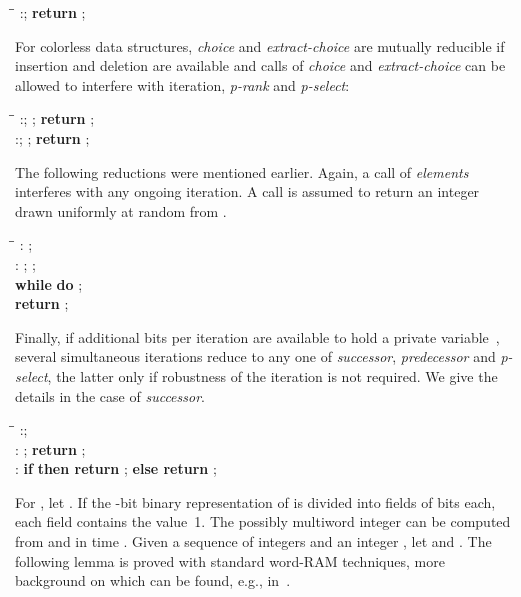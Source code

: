 \documentclass[envcountsame,envcountsect,undated,nolinenumbers]{lnthi}
\def\Tvn#1{\hbox{\textit{#1\/}}}
\begin{document}
\begin{tabbing}
\quad\=\hskip 3cm\=\kill
\>:\>;
 \textbf{return} ;
\end{tabbing}

\noindent
For colorless data structures,
\Tvn{choice} and \Tvn{extract-choice} are
mutually reducible if insertion and
deletion are available
and calls of 
\Tvn{choice} and \Tvn{extract-choice} can be allowed
to interfere with iteration,
\Tvn{p-rank} and \Tvn{p-select}:

\begin{tabbing}
\quad\=\hskip 3cm\=\kill
\>:\>;
 ; \textbf{return} ;\\
\>:\>;
 ; \textbf{return} ;
\end{tabbing}

\noindent
The following reductions were mentioned earlier.
Again, a call of \Tvn{elements} interferes with
any ongoing iteration.
A call  is assumed to return an integer
drawn uniformly at random from .

\begin{tabbing}
\quad\=\hskip 3cm\=\kill
\>:\>
 ;\\
\>:\>
 ; ;\\
\>\>\textbf{while} 
 \textbf{do} ;\\
\>\>\textbf{return} ;
\end{tabbing}

\noindent
Finally, if  additional bits
per iteration are available to hold a
private variable~, several simultaneous
iterations reduce to any one of
\Tvn{successor}, \Tvn{predecessor}
and \Tvn{p-select}, the latter only if
robustness of the iteration is not required.
We give the details in the case of \Tvn{successor}.

\begin{tabbing}
\quad\=\hskip 3cm\=\kill
\>:\>;\\
\>:\>
 ; \textbf{return} ;\\
\>:\>
 \textbf{if}  \textbf{then return} ;
 \textbf{else return} ;
\end{tabbing}

For , let
.
If the -bit binary representation of
 is divided into  fields of
 bits each, each field contains the value~1.
The possibly multiword integer  can be
computed from  and  in 
time \cite[Theorem 2.5]{Hag15}.
Given a sequence  of
 integers and an integer ,
let  and .
The following lemma is proved with standard
word-RAM techniques,
more background on which can be found,
e.g., in~\cite{Hag98}.
\end{document}
